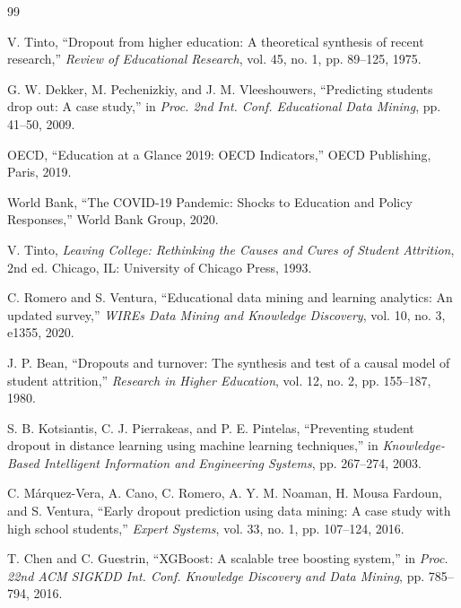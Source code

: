 \documentclass[journal]{IEEEtran}
\begin{document}
\begin{thebibliography}{99}

V. Tinto, ``Dropout from higher education: A theoretical synthesis of recent research,'' \textit{Review of Educational Research}, vol. 45, no. 1, pp. 89--125, 1975.

G. W. Dekker, M. Pechenizkiy, and J. M. Vleeshouwers, ``Predicting students drop out: A case study,'' in \textit{Proc. 2nd Int. Conf. Educational Data Mining}, pp. 41--50, 2009.

OECD, ``Education at a Glance 2019: OECD Indicators,'' OECD Publishing, Paris, 2019.

World Bank, ``The COVID-19 Pandemic: Shocks to Education and Policy Responses,'' World Bank Group, 2020.

V. Tinto, \textit{Leaving College: Rethinking the Causes and Cures of Student Attrition}, 2nd ed. Chicago, IL: University of Chicago Press, 1993.

C. Romero and S. Ventura, ``Educational data mining and learning analytics: An updated survey,'' \textit{WIREs Data Mining and Knowledge Discovery}, vol. 10, no. 3, e1355, 2020.

J. P. Bean, ``Dropouts and turnover: The synthesis and test of a causal model of student attrition,'' \textit{Research in Higher Education}, vol. 12, no. 2, pp. 155--187, 1980.

S. B. Kotsiantis, C. J. Pierrakeas, and P. E. Pintelas, ``Preventing student dropout in distance learning using machine learning techniques,'' in \textit{Knowledge-Based Intelligent Information and Engineering Systems}, pp. 267--274, 2003.

C. Márquez-Vera, A. Cano, C. Romero, A. Y. M. Noaman, H. Mousa Fardoun, and S. Ventura, ``Early dropout prediction using data mining: A case study with high school students,'' \textit{Expert Systems}, vol. 33, no. 1, pp. 107--124, 2016.

T. Chen and C. Guestrin, ``XGBoost: A scalable tree boosting system,'' in \textit{Proc. 22nd ACM SIGKDD Int. Conf. Knowledge Discovery and Data Mining}, pp. 785--794, 2016.


\end{thebibliography}
\end{document}
